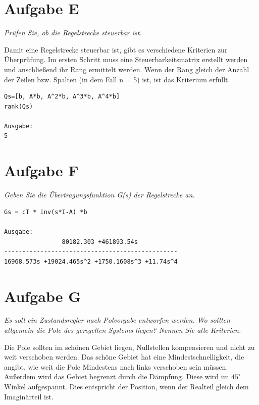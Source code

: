 \section{Aufgabe E}
\textit{Prüfen Sie, ob die Regelstrecke steuerbar ist.}

\noindent Damit eine Regelstrecke steuerbar ist, gibt es verschiedene Kriterien zur Überprüfung. Im ersten Schritt muss eine Steuerbarkeitsmatrix erstellt werden und anschließend ihr Rang ermittelt werden. Wenn der Rang gleich der Anzahl der Zeilen bzw. Spalten (in dem Fall n = 5) ist, ist das Kriterium erfüllt.
\begin{lstlisting}[caption = Steuerbarkeitsmatrix, captionpos = b, label = lst:example]
Qs=[b, A*b, A^2*b, A^3*b, A^4*b]
rank(Qs)  

Ausgabe:
5\end{lstlisting}


\section{Aufgabe F}
\textit{Geben Sie die Übertragungsfunktion G(s) der Regelstrecke an.}

\noindent 

\begin{lstlisting}[caption = Übertragungsfunktion G(s), captionpos = b, label = lst:example]
Gs = cT * inv(s*I-A) *b
    
Ausgabe:
                80182.303 +461893.54s                
------------------------------------------------  
16968.573s +19024.465s^2 +1750.1608s^3 +11.74s^4 
\end{lstlisting}



\section{Aufgabe G}
\textit{Es soll ein Zustandsregler nach Polvorgabe entworfen werden. Wo sollten allgemein die Pole des geregelten Systems liegen? Nennen Sie alle Kriterien.}

\noindent Die Pole sollten im schönen Gebiet liegen, Nullstellen kompensieren und nicht zu weit verschoben werden. Das schöne Gebiet hat eine Mindestschnelligkeit, die angibt, wie weit die Pole Mindestens nach links verschoben sein müssen. Außerdem wird das Gebiet begrenzt durch die Dämpfung. Diese wird im $45 ^\circ$ Winkel aufgespannt. Dies entspricht der Position, wenn der Realteil gleich dem Imaginärteil ist. 




